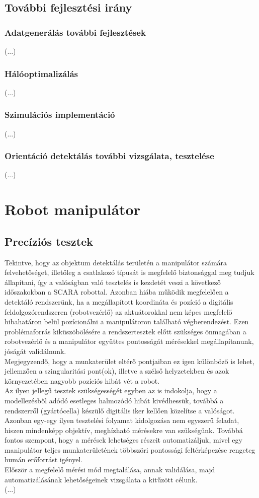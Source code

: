 \documentclass{article}
\begin{document}
\subsection{További fejlesztési irány}
\subsubsection{Adatgenerálás további fejlesztések}
(...)
\subsubsection{Hálóoptimalizálás}
(...)
\subsubsection{Szimulációs implementáció}
(...)
\subsubsection{Orientáció detektálás további vizsgálata, tesztelése}
(...)
\section{Robot manipulátor}
\subsection{Precíziós tesztek}
Tekintve, hogy az objektum detektálás területén a manipulátor számára
felvehetőséget, illetőleg a csatlakozó típusát is megfelelő biztonsággal
meg tudjuk állapítani, így a valóságban való tesztelés is kezdetét veszi 
a következő időszakokban a SCARA robottal. Azonban hiába működik megfelelően
a detektáló rendszerünk, ha a megállapított koordináta és pozíció a 
digitális feldolgozórendszeren (robotvezérlő) az aktuátorokkal nem képes
megfelelő hibahatáron belül pozícionálni a manipulátoron található végberendezést.
Ezen problémaforrás kiküszöbölésére a rendszertesztek előtt szükséges 
önmagában a robotvezérlő és a manipulátor együttes pontosságát mérésekkel
megállapítanunk, jóságát validálnunk.\\[5pt]
Megjegyzendő, hogy a munkaterület eltérő pontjaiban ez igen különböző is
lehet, jellemzően a szingularitási pont(ok), illetve a szélső helyzetekben
és azok környezetében nagyobb pozíciós hibát vét a robot.\\[5pt]
Az ilyen jellegű tesztek szükségességét egyben az is indokolja, hogy
a modellezésből adódó esetleges halmozódó hibát kivédhessük, továbbá 
a rendszerről (gyártócella) készülő digitális iker kellően közelítse
a valóságot.\\[5pt]
Azonban egy-egy ilyen tesztelési folyamat kidolgozása nem egyszerű 
feladat, hiszen mindenképp objektív, meghízható mérésekre van szükségünk.
Továbbá fontos szempont, hogy a mérések lehetséges részeit automatizáljuk,
mivel egy manipulátor teljes munkaterületének többszöri pontossági
feltérképezése rengeteg humán erőforrást igényel.\\[5pt]
Először a megfelelő mérési mód megtalálása, annak validálása, majd 
automatizálásának lehetőségeinek vizsgálata a kitűzött célunk.\\
(...)
\end{document}
